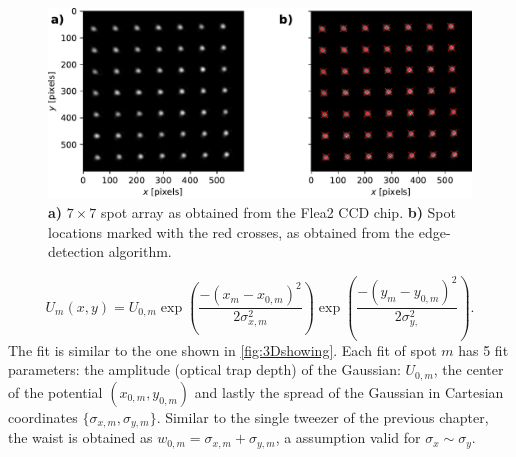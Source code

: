 \begin{figure}
    \centering
    \includegraphics[width=\textwidth]{figures/CamImgLoGSpots.pdf}
    \caption{\textsf{\textbf{a)}} $7\times7$ spot array as obtained from the Flea2 CCD chip.
    \textsf{\textbf{b)}} Spot locations marked with the red crosses, as obtained from the edge-detection algorithm. }
    \label{fig:CameraLoG}
\end{figure}

\begin{equation}\label{eq:2DGaussianNumberK}
    U_m(x,y) = U_{0,m}\exp{\left(\frac{-(x_m-x_{0,m})^2}{2\sigma_{x,m}^2}\right)}
    \exp{\left( \frac{-(y_m-y_{0,m})^2}{2\sigma_{y,}^2} \right)}.
\end{equation}
The fit is similar to the one shown in \cref{fig:3Dshowing}.
Each fit of spot $m$ has 5 fit parameters: the amplitude (optical trap depth) of the Gaussian: $U_{0,m}$, the center of the potential $(x_{0,m}, y_{0,m})$ and lastly the spread of the Gaussian in Cartesian coordinates $\{\sigma_{x,m},\sigma_{y,m}\}$.
Similar to the single tweezer of the previous chapter, the waist is obtained as $w_{0,m} = \sigma_{x,m}+\sigma_{y,m}$, a assumption valid for $\sigma_x\sim\sigma_y$.

